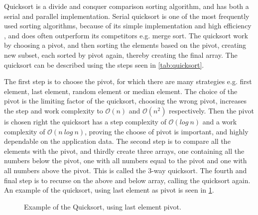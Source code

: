 Quicksort is a divide and conquer comparison sorting algorithm, and has both a serial and parallel implementation. Serial quicksort is one of the most frequently used sorting algorithms, because of its simple implementation and high efficiency , and does often outperform its competitors e.g.  merge sort. The quicksort work by choosing a pivot, and then sorting the elements based on the pivot, creating new subset, each sorted by pivot again, thereby creating the final array. The quicksort can be described using the steps seen in \cref{tab:quicksort}.

\begin{center}
	\label{tab:quicksort}
\end{center} 

The first step is to choose the pivot, for which there are many strategies e.g. first element, last element, random element or median element. The choice of the pivot is the limiting factor of the quicksort, choosing the wrong pivot, increases the step and work complexity to $\mathcal{O}(n)$ and $\mathcal{O}(n^2)$ respectively. Then the pivot is chosen right the quicksort has a step complexity of $\mathcal{O}(log ~ n)$ and a work complexity of $\mathcal{O}(n~log~n)$, proving the choose of pivot is important, and highly dependable on the application data. The second step is to compare all the elements with the pivot, and thirdly create three arrays, one containing all the numbers below the pivot, one with all numbers equal to the pivot and one with all numbers above the pivot. This is called the 3-way quicksort. The fourth and final step is to recurse on the above and below array, calling the quicksort again. An example of the quicksort, using last element as pivot is seen in \cref{fig:sort_quicksort}.

\begin{figure}[ht]
	\centering
	\caption{Example of the Quicksort, using last element pivot.}
	\label{fig:sort_quicksort}
\end{figure}  

